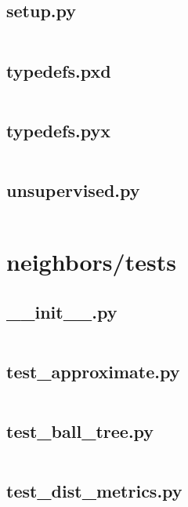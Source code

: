 \documentclass{article}
\begin{document}
\subsection{setup.py}
\inputminted{python}{/home/dufferzafar/dev/@clones/scikit-learn/sklearn/neighbors/setup.py}
\newpage

\subsection{typedefs.pxd}
\inputminted{cython}{/home/dufferzafar/dev/@clones/scikit-learn/sklearn/neighbors/typedefs.pxd}
\newpage

\subsection{typedefs.pyx}
\inputminted{cython}{/home/dufferzafar/dev/@clones/scikit-learn/sklearn/neighbors/typedefs.pyx}
\newpage

\subsection{unsupervised.py}
\inputminted{python}{/home/dufferzafar/dev/@clones/scikit-learn/sklearn/neighbors/unsupervised.py}
\newpage

\section{neighbors/tests}

\subsection{\_\_init\_\_.py}
\inputminted{python}{/home/dufferzafar/dev/@clones/scikit-learn/sklearn/neighbors/tests/__init__.py}
\newpage

\subsection{test\_approximate.py}
\inputminted{python}{/home/dufferzafar/dev/@clones/scikit-learn/sklearn/neighbors/tests/test_approximate.py}
\newpage

\subsection{test\_ball\_tree.py}
\inputminted{python}{/home/dufferzafar/dev/@clones/scikit-learn/sklearn/neighbors/tests/test_ball_tree.py}
\newpage

\subsection{test\_dist\_metrics.py}
\inputminted{python}{/home/dufferzafar/dev/@clones/scikit-learn/sklearn/neighbors/tests/test_dist_metrics.py}
\newpage
\end{document}
